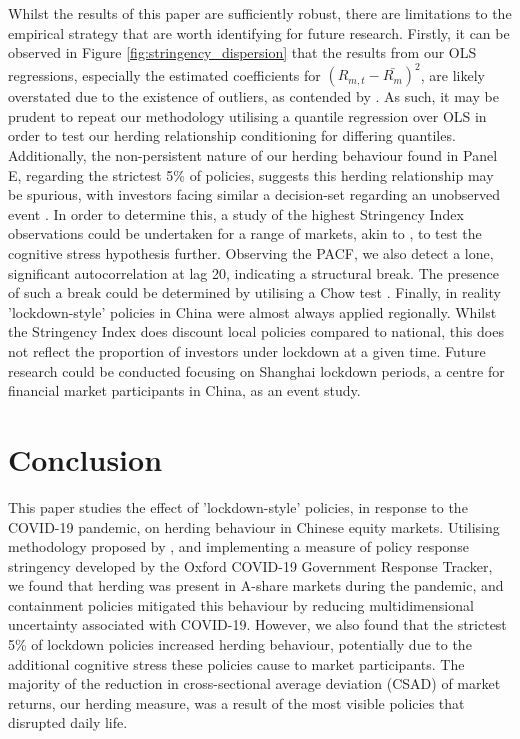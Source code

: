 \documentclass[12pt]{article}
\numberwithin{table}{section}   %
\begin{document}
Whilst the results of this paper are sufficiently robust, there are limitations to the empirical strategy that are worth identifying for future research. Firstly, it can be observed in Figure \ref{fig:stringency_dispersion} that the results from our OLS regressions, especially the estimated coefficients for $(R_{m,t}-\bar{R_m})^2$, are likely overstated due to the existence of outliers, as contended by \citet{chiang}. As such, it may be prudent to repeat our methodology utilising a quantile regression over OLS in order to test our herding relationship conditioning for differing quantiles. Additionally, the non-persistent nature of our herding behaviour found in Panel E, regarding the strictest 5\% of policies, suggests this herding relationship may be spurious, with investors facing similar a decision-set regarding an unobserved event \citep{bikh-review}. In order to determine this, a study of the highest Stringency Index observations could be undertaken for a range of markets, akin to \citet{kizys}, to test the cognitive stress hypothesis further. Observing the PACF, we also detect a lone, significant autocorrelation at lag 20, indicating a structural break. The presence of such a break could be determined by utilising a Chow test \citep{chow}. Finally, in reality 'lockdown-style' policies in China were almost always applied regionally. Whilst the Stringency Index does discount local policies compared to national, this does not reflect the proportion of investors under lockdown at a given time. Future research could be conducted focusing on Shanghai lockdown periods, a centre for financial market participants in China, as an event study. 

\section{Conclusion}
This paper studies the effect of 'lockdown-style' policies, in response to the COVID-19 pandemic, on herding behaviour in Chinese equity markets. Utilising methodology proposed by \citet{cck}, and implementing a measure of policy response stringency developed by the Oxford COVID-19 Government Response Tracker, we found that herding was present in A-share markets during the pandemic, and containment policies mitigated this behaviour by reducing multidimensional uncertainty associated with COVID-19. However, we also found that the strictest 5\% of lockdown policies increased herding behaviour, potentially due to the additional cognitive stress these policies cause to market participants. The majority of the reduction in cross-sectional average deviation (CSAD) of market returns, our herding measure, was a result of the most visible policies that disrupted daily life.
\end{document}
